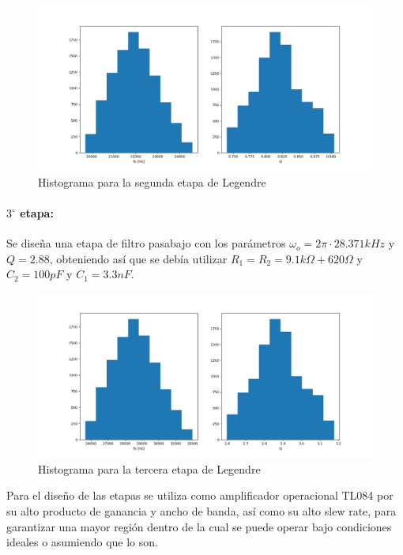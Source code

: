 \begin{figure}[H]
    \centering
    \includegraphics[scale=0.4]{../EJ1/Recursos/legendre_histogram_two.png}
    \caption{Histograma para la segunda etapa de Legendre}
    \label{fig:legendre_histogram_two}
\end{figure}

\paragraph{$3^{\circ}$ etapa:} Se dise\~na una etapa de filtro pasabajo con los par\'ametros $\omega_o = 2 \pi \cdot 28.371kHz$ y $Q = 2.88$, obteniendo as\'i que se deb\'ia utilizar $R_1 = R_2 = 9.1k\Omega + 620 \Omega$ y $C_2 = 100pF$ y $C_1 = 3.3nF$.

\begin{figure}[H]
    \centering
    \includegraphics[scale=0.4]{../EJ1/Recursos/legendre_histogram_three.png}
    \caption{Histograma para la tercera etapa de Legendre}
    \label{fig:legendre_histogram_three}
\end{figure}

Para el dise\~no de las etapas se utiliza como amplificador operacional TL084 por su alto producto de ganancia y ancho de banda, as\'i como su alto slew rate, para garantizar una mayor regi\'on dentro de la cual se puede operar bajo condiciones ideales o asumiendo que lo son.


